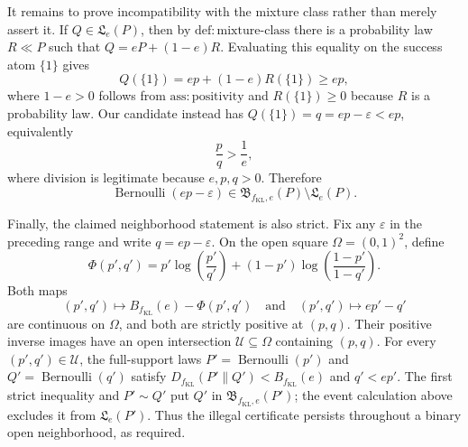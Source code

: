 It remains to prove incompatibility with the mixture class rather than merely assert it.  If \(Q\in\mathfrak L_e(P)\), then by \(\mathrm{def{:}mixture\text{-}class}\) there is a probability law \(R\ll P\) such that \(Q=eP+(1-e)R\).  Evaluating this equality on the success atom \(\{1\}\) gives
\[
 Q(\{1\})=ep+(1-e)R(\{1\})\ge ep,
\]
where \(1-e>0\) follows from \(\mathrm{ass{:}positivity}\) and \(R(\{1\})\ge0\) because \(R\) is a probability law.  Our candidate instead has \(Q(\{1\})=q=ep-\varepsilon<ep\), equivalently
\[
 \frac{p}{q}>\frac1e,
\]
where division is legitimate because \(e,p,q>0\).  Therefore
\[
 \operatorname{Bernoulli}(ep-\varepsilon)
 \in\mathfrak B_{f_{\mathrm{KL}},e}(P)
 \setminus\mathfrak L_e(P).
\]

Finally, the claimed neighborhood statement is also strict.  Fix any \(\varepsilon\) in the preceding range and write \(q=ep-\varepsilon\).  On the open square \(\Omega=(0,1)^2\), define
\[
 \Phi(p',q')=p'\log\!\left(\frac{p'}{q'}\right)
 +(1-p')\log\!\left(\frac{1-p'}{1-q'}\right).
\]
Both maps
\[
 (p',q')\longmapsto B_{f_{\mathrm{KL}}}(e)-\Phi(p',q')
 \quad\text{and}\quad
 (p',q')\longmapsto ep'-q'
\]
are continuous on \(\Omega\), and both are strictly positive at \((p,q)\).  Their positive inverse images have an open intersection \(\mathcal U\subseteq\Omega\) containing \((p,q)\).  For every \((p',q')\in\mathcal U\), the full-support laws \(P'=\operatorname{Bernoulli}(p')\) and \(Q'=\operatorname{Bernoulli}(q')\) satisfy \(D_{f_{\mathrm{KL}}}(P'\|Q')<B_{f_{\mathrm{KL}}}(e)\) and \(q'<ep'\).  The first strict inequality and \(P'\sim Q'\) put \(Q'\) in \(\mathfrak B_{f_{\mathrm{KL}},e}(P')\); the event calculation above excludes it from \(\mathfrak L_e(P')\).  Thus the illegal certificate persists throughout a binary open neighborhood, as required.